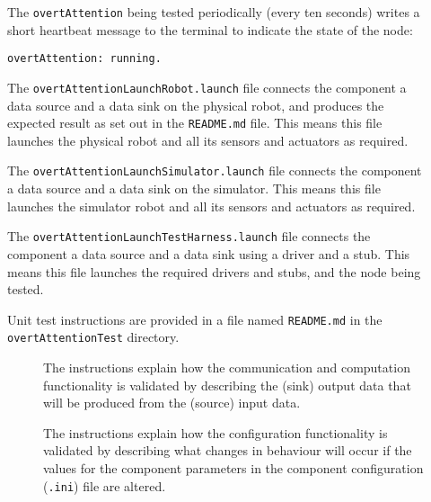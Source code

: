 \documentclass{CSSRforAfrica}
\newcommand{\checkboxChecked}{\fbox{\ding{51}}} %
\newcommand{\checkboxDashed}{\fbox{--}}         %
\begin{document}
\begin{description}
\item[\checkboxChecked]  The {\small \verb+overtAttention+} being tested periodically (every ten seconds) writes a short heartbeat message to
 the terminal to indicate the state of the node:
\begin{verbatim}
overtAttention: running.
\end{verbatim}

\item[\checkboxDashed] The {\small \verb+overtAttentionLaunchRobot.launch+} file  connects the component a data source and a data sink on the physical robot, and produces the expected result as set out in the  {\small \verb+README.md+}  file.    This means this file launches the physical robot and all its sensors and actuators as required.

\item[\checkboxDashed] The {\small \verb+overtAttentionLaunchSimulator.launch+} file  connects the component a data source and a data sink on the simulator.   This means this file launches the simulator robot and all its sensors and actuators as required.

\item[\checkboxDashed] The {\small \verb+overtAttentionLaunchTestHarness.launch+} file  connects the component a data source and a data sink using a driver and a stub.   This means this file launches the required drivers and stubs, and the node being tested.

\item[\checkboxChecked] Unit test instructions are provided in a file named {\small \verb+README.md+} in the  {\small \verb+overtAttentionTest+} directory. 


\begin{description}

\item[\checkboxChecked] The instructions explain how the communication and computation functionality is validated by describing the (sink) output data that will be produced from the (source) input data.  

\item[\checkboxChecked] The instructions explain how the configuration functionality is validated by describing what changes in behaviour will occur if the values for the component parameters in the component configuration ({\small \verb+.ini+}) file are altered.

\end{description}

\end{description} 
\end{document}
